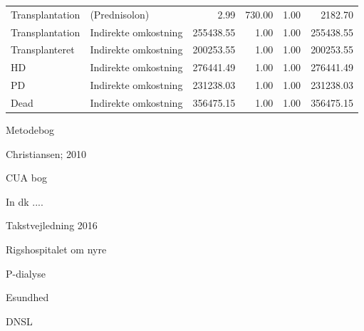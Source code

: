\documentclass[a4paper,12pt]{article}
\begin{document}
\begin{adjustbox}{center}
\begin{tabular}{llrrrr}
		Transplantation & (Prednisolon) & 2.99 & 730.00 & 1.00 & 2182.70 \\ 
		Transplantation & Indirekte omkostning & 255438.55 & 1.00 & 1.00 & 255438.55 \\ 
		Transplanteret & Indirekte omkostning & 200253.55 & 1.00 & 1.00 & 200253.55 \\ 
		HD & Indirekte omkostning & 276441.49 & 1.00 & 1.00 & 276441.49 \\ 
		PD & Indirekte omkostning & 231238.03 & 1.00 & 1.00 & 231238.03 \\ 
		Dead & Indirekte omkostning & 356475.15 & 1.00 & 1.00 & 356475.15 \\ 
		\hline
	\end{tabular}

\end{adjustbox}



\newpage
\begin{thebibliography}{9}

Metodebog

Christiansen; 2010

CUA bog

In dk .... 

Takstvejledning 2016

Rigshospitalet om nyre

P-dialyse

Esundhed

DNSL

\end{thebibliography}	
	
\end{document}
